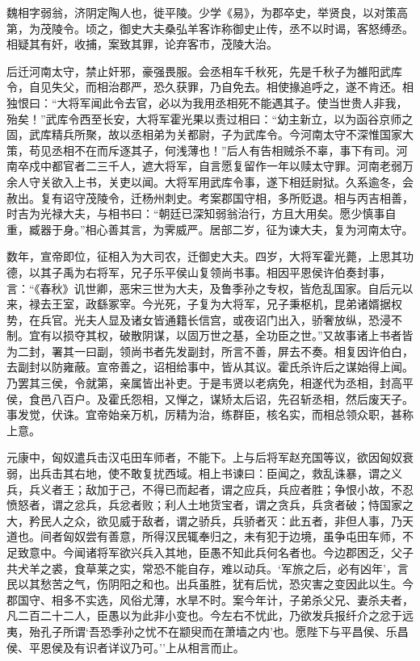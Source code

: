 \documentclass[]{article}
\begin{document}
魏相字弱翁，济阴定陶人也，徙平陵。少学《易》，为郡卒史，举贤良，以对策高第，为茂陵令。顷之，御史大夫桑弘羊客诈称御史止传，丞不以时谒，客怒缚丞。相疑其有奸，收捕，案致其罪，论弃客市，茂陵大治。

后迁河南太守，禁止奸邪，豪强畏服。会丞相车千秋死，先是千秋子为雒阳武库令，自见失父，而相治郡严，恐久获罪，乃自免去。相使掾追呼之，遂不肯还。相独恨曰：``大将军闻此令去官，必以为我用丞相死不能遇其子。使当世贵人非我，殆矣！''武库令西至长安，大将军霍光果以责过相曰：``幼主新立，以为函谷京师之固，武库精兵所聚，故以丞相弟为关都尉，子为武库令。今河南太守不深惟国家大策，苟见丞相不在而斥逐其子，何浅薄也！''后人有告相贼杀不辜，事下有司。河南卒戍中都官者二三千人，遮大将军，自言愿复留作一年以赎太守罪。河南老弱万余人守关欲入上书，关吏以闻。大将军用武库令事，遂下相廷尉狱。久系逾冬，会赦出。复有诏守茂陵令，迁杨州刺史。考案郡国守相，多所贬退。相与丙吉相善，时吉为光禄大夫，与相书曰：``朝廷已深知弱翁治行，方且大用矣。愿少慎事自重，臧器于身。''相心善其言，为霁威严。居部二岁，征为谏大夫，复为河南太守。

数年，宣帝即位，征相入为大司农，迁御史大夫。四岁，大将军霍光薨，上思其功德，以其子禹为右将军，兄子乐平侯山复领尚书事。相因平恩侯许伯奏封事，言：``《春秋》讥世卿，恶宋三世为大夫，及鲁季孙之专权，皆危乱国家。自后元以来，禄去王室，政繇冢宰。今光死，子复为大将军，兄子秉枢机，昆弟诸婿据权势，在兵官。光夫人显及诸女皆通籍长信宫，或夜诏门出入，骄奢放纵，恐浸不制。宜有以损夺其权，破散阴谋，以固万世之基，全功臣之世。''又故事诸上书者皆为二封，署其一曰副，领尚书者先发副封，所言不善，屏去不奏。相复因许伯白，去副封以防雍蔽。宣帝善之，诏相给事中，皆从其议。霍氏杀许后之谋始得上闻。乃罢其三侯，令就第，亲属皆出补吏。于是韦贤以老病免，相遂代为丞相，封高平侯，食邑八百户。及霍氏怨相，又惮之，谋矫太后诏，先召斩丞相，然后废天子。事发觉，伏诛。宜帝始亲万机，厉精为治，练群臣，核名实，而相总领众职，甚称上意。

元康中，匈奴遣兵击汉屯田车师者，不能下。上与后将军赵充国等议，欲因匈奴衰弱，出兵击其右地，使不敢复扰西域。相上书谏曰：臣闻之，救乱诛暴，谓之义兵，兵义者王；敌加于己，不得已而起者，谓之应兵，兵应者胜；争恨小故，不忍愤怒者，谓之忿兵，兵忿者败；利人土地货宝者，谓之贪兵，兵贪者破；恃国家之大，矜民人之众，欲见威于敌者，谓之骄兵，兵骄者灭：此五者，非但人事，乃天道也。间者匈奴尝有善意，所得汉民辄奉归之，未有犯于边境，虽争屯田车师，不足致意中。今闻诸将军欲兴兵入其地，臣愚不知此兵何名者也。今边郡困乏，父子共犬羊之裘，食草莱之实，常恐不能自存，难以动兵。`军旅之后，必有凶年'，言民以其愁苦之气，伤阴阳之和也。出兵虽胜，犹有后忧，恐灾害之变因此以生。今郡国守、相多不实选，风俗尤薄，水旱不时。案今年计，子弟杀父兄、妻杀夫者，凡二百二十二人，臣愚以为此非小变也。今左右不忧此，乃欲发兵报纤介之忿于远夷，殆孔子所谓`吾恐季孙之忧不在颛臾而在萧墙之内'也。愿陛下与平昌侯、乐昌侯、平恩侯及有识者详议乃可。''上从相言而止。
\end{document}
